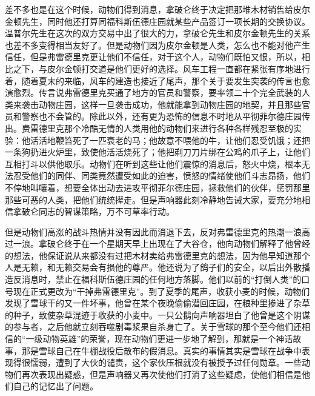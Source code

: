 差不多也是在这个时候，动物们得到消息，拿破仑终于决定把那堆木材销售给皮尔金顿先生，同时他还打算同福科斯伍德庄园就某些产品签订一项长期的交换协议。温普尔先生在这次的双方交易中出了很大的力，拿破仑先生和皮尔金顿先生的关系也差不多变得相当友好了。但是动物们因为皮尔金顿是人类，怎么也不能对他产生信任，但是弗雷德里克更让他们不信任，对于这个人，动物们既怕又恨，所以，相比之下，与皮尔金顿打交道是他们更好的选择。风车工程一直都在紧张有序地进行着，随着夏末的来临，风车的建造也接近了尾声，那个关于要发生突袭的传言也愈演愈烈。传言说弗雷德里克买通了地方的官员和警察，要率领二十个完全武装的人类来袭击动物庄园，这样一旦袭击成功，他就能拿到动物庄园的地契，并且那些官员和警察也不会管的。除此以外，还有更为恐怖的信息不时地从平彻菲尔德庄园传出。费雷德里克那个冷酷无情的人类用他的动物们来进行各种各样残忍至极的实验：他活活地鞭笞死了一匹衰老的马；他故意不喂他的牛，让他们忍受饥饿；还把一条狗扔进火炉里，致使他活活烧死了；他把剃刀刀片绑在公鸡的爪子上，让他们互相打斗以供他取乐。动物们在听到这些让他们震惊的消息后，怒火中烧，根本无法忍受他们的同伴、同类竟然遭受如此的迫害，愤怒的情绪使他们斗志昂扬，他们不停地叫嚷着，想要全体出动去进攻平彻菲尔德庄园，拯救他们的伙伴，惩罚那里那些可恶的人类，把他们统统撵走。但是声响器此刻冷静地告诫大家，要充分地相信拿破仑同志的智谋策略，万不可草率行动。

但是动物们高涨的战斗热情并没有因此而消退下去，反对弗雷德里克的热潮一浪高过一浪。拿破仑终于在一个星期天早上出现在了大谷仓，他向动物们解释了他曾经的想法，他保证说从来都没有过把木材卖给弗雷德里克的想法，因为他早知道那个人是无赖，和无赖交易会有损他的尊严。他还说为了鸽子们的安全，以后出外散播造反消息时，禁止在福科斯伍德庄园的任何地方落脚。他们以前的“打倒人类”的口号现在正式更改为“干掉弗雷德里克”。到了夏季的尾声，收获小麦的时候，动物们发现了雪球干的又一件坏事，他曾在某个夜晚偷偷潜回庄园，在粮种里掺进了杂草的种子，致使杂草混迹于收获的小麦中。一只公鹅向声响器坦白了他曾是这个阴谋的参与者，之后他就立刻吞噬剧毒浆果自杀身亡了。关于雪球的那个至今他们还相信的“一级动物英雄”的荣誉，现在动物们更进一步地了解到，那就是一个神话故事，那是雪球自己在牛棚战役后散布的假消息。真实的事情其实是雪球在战争中表现得很懦弱，遭到了大伙的谴责，这个家伙压根就没有被授予过任何勋章。一些动物们再次表现出疑惑，但是声响器又再次使他们打消了这些疑虑，使他们相信是他们自己的记忆出了问题。


